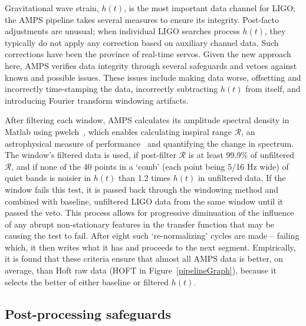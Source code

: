 Gravitational wave strain, $h(t)$, is the most important data channel for LIGO; the AMPS pipeline takes several measures to ensure its integrity. Post-facto adjustments are unusual; when individual LIGO searches process $h(t)$, they typically do not apply any correction based on auxiliary channel data. Such corrections have been the province of real-time servos. Given the new approach here, AMPS verifies data integrity through several safeguards and vetoes against known and possible issues. These issues include making data worse, offsetting and incorrectly time-stamping the data, incorrectly subtracting $h(t)$ from itself, and introducing Fourier transform windowing artifacts.

After filtering each window, AMPS calculates its amplitude spectral density in Matlab using pwelch~\cite{Matlab2012a,Welch1967}, which enables calculating inspiral range $\mathcal{R}$, an astrophysical measure of performance~\cite{FinnInspiral1993} and quantifying  the change in spectrum. The window's filtered data is used, if post-filter $\mathcal{R}$ is at least 99.9\% of unfiltered $\mathcal{R}$, and if none of the 40 points in a `comb' (each point being 5/16 Hz wide) of quiet bands is noisier in $h(t)$ than 1.2 times $h(t)$ in unfiltered data. If the window fails this test, it is passed back through the windowing method and combined with baseline, unfiltered LIGO data from the same window until it passed the veto. This process allows for progressive diminuation of the influence of any abrupt non-stationary features in the transfer function that may be causing the test to fail. After eight such `re-normalizing' cycles are made -- failing which, it then writes what it has and proceeds to the next segment. Empirically, it is found that these criteria ensure that almost all AMPS data is better, on average, than Hoft raw data (HOFT in Figure~\ref{pipelineGraph}), because it selects the better of either baseline or filtered $h(t)$.

    \subsection{Post-processing safeguards}
    \label{postprocessingSafeguards}

